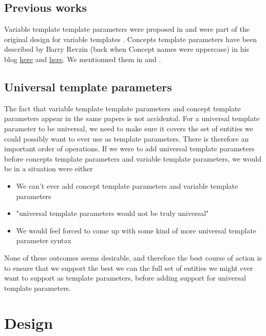 \documentclass{wg21}
\begin{document}
\subsection{Previous works}

Variable template template parameters were proposed in  and were part of the original design for variable templates .
Concepts template parameters have been described by Barry Revzin (back when Concept names were uppercase) in his blog \href{https://brevzin.github.io/c++/2019/01/09/concept-templates/}{here} and \href{https://brevzin.github.io/c++/2019/03/24/concept-templates-2/}{here}.
We mentionned them in  and .

\subsection{Universal template parameters}

The fact that variable template template parameters and concept template parameters appear in the same papers is not accidental.
For a universal template parameter to be universal, we need to make sure it covers the set of entities we could possibly want to ever use as template parameters.
There is therefore an important order of operations.
If we were to add universal template parameters before concepts template parameters and variable template parameters, we would be in a situation were either
\begin{itemize}
\item We can't ever add concept template parameters and variable template parameters
\item "universal template parameters would not be truly universal"
\item We would feel forced to come up with some kind of more universal template parameter syntax
\end{itemize}

None of these outcomes seems desirable, and therefore the best course of action is to ensure that we
support the best we can the full set of entities we might ever want to support as template parameters, before adding support for universal template parameters.

\section{Design}

%
\end{document}
